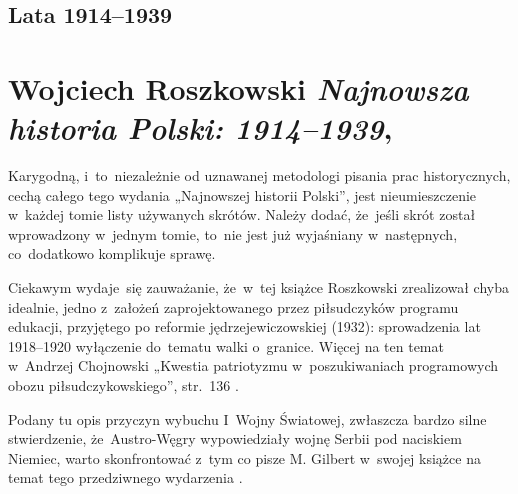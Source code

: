 \documentclass[a4paper,11pt]{article}
\numberwithin{equation}{section}
\begin{document}
\VerSpaceTwo










\subsection{Lata 1914--1939}

\VerSpaceThree



\section{Wojciech Roszkowski \textit{Najnowsza historia
    Polski: 1914--1939},
  \cite{RoszkowskiNajnowszaHistoriaPolski1914-1939Wyd2011} }




Karygodną, i~to~niezależnie od uznawanej metodologi pisania
prac historycznych, cechą całego tego wydania „Najnowszej historii
Polski”, jest nieumieszczenie w~każdej tomie listy używanych
skrótów. Należy dodać, że~jeśli skrót został wprowadzony w~jednym
tomie, to~nie jest już wyjaśniany w~następnych, co~dodatkowo
komplikuje sprawę.

\VerSpaceFour





Ciekawym wydaje~się zauważanie, że~w~tej książce Roszkowski
zrealizował chyba idealnie, jedno z~założeń zaprojektowanego przez
piłsudczyków programu edukacji, przyjętego po reformie
jędrzejewiczowskiej (1932): sprowadzenia lat 1918--1920 wyłączenie
do~tematu walki o~granice. Więcej na ten temat w~Andrzej Chojnowski
„Kwestia patriotyzmu w~poszukiwaniach programowych obozu
piłsudczykowskiego”, str.~136 \cite{RedKloczkowskiPatriotyzmPolakow2006}.

\VerSpaceFour





 Podany tu opis przyczyn wybuchu I~Wojny Światowej,
zwłaszcza bardzo silne stwierdzenie, że~Austro-Węgry
wypowiedziały wojnę Serbii pod naciskiem Niemiec, warto skonfrontować
z~tym co pisze M. Gilbert w~swojej książce na temat tego przedziwnego
wydarzenia \cite{GilbertPierwszaWojnaSwiatowa2003}.
\end{document}

